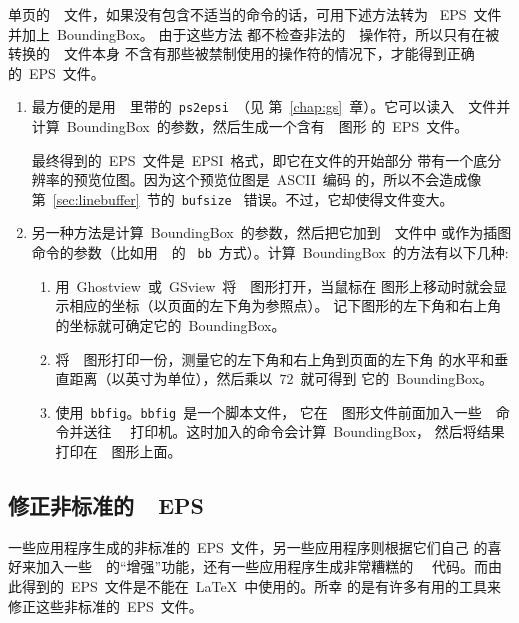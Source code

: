 单页的~\PS{}~文件，如果没有包含不适当的命令的话，可用下述方法转为
~EPS~文件并加上~BoundingBox。{ 由于这些方法
	都不检查非法的~\PS{}~操作符，所以只有在被转换的~\PS{}~文件本身
	不含有那些被禁制使用的操作符的情况下，才能得到正确的~EPS~文件。}
\begin{enumerate}
	\item 最方便的是用~\GS{}~里带的~\texttt{ps2epsi}~（见
	第~\ref{chap:gs}~章）。它可以读入~\PS{}~文件并
	计算~BoundingBox~的参数，然后生成一个含有~\PS{}~图形
	的~EPS~文件。
	
	最终得到的~EPS~文件是~EPSI~格式，即它在文件的开始部分
	带有一个底分辨率的预览位图。因为这个预览位图是~ASCII~编码
	的，所以不会造成像第~\ref{sec:linebuffer}~节的~\texttt{bufsize}~
	错误。不过，它却使得文件变大。
	\item 另一种方法是计算~BoundingBox~的参数，然后把它加到~\PS{}~文件中
	或作为插图命令的参数（比如用~~的
	~\texttt{bb}~方式）。计算~BoundingBox~的方法有以下几种:
	\begin{enumerate}
		\item 用~Ghostview~或~GSview~将~\PS~图形打开，当鼠标在
		图形上移动时就会显示相应的坐标（以页面的左下角为参照点）。
		记下图形的左下角和右上角的坐标就可确定它的~BoundingBox。
		\item 将~\PS~图形打印一份，测量它的左下角和右上角到页面的左下角                       的水平和垂直距离（以英寸为单位），然后乘以~$72$~就可得到
		它的~BoundingBox。
		\item 使用~\texttt{bbfig}。\texttt{bbfig}~是一个脚本文件，
		它在~\PS{}~图形文件前面加入一些~\PS{}~命令并送往
		~\PS{}~打印机。这时加入的命令会计算~BoundingBox，
		然后将结果打印在~\PS{}~图形上面。
	\end{enumerate}
\end{enumerate}

\clearpage

\subsection[修正非标准的~EPS]{修正非标准的~~EPS}\label{ssec:fixeps}

一些应用程序生成的非标准的~EPS~文件，另一些应用程序则根据它们自己
的喜好来加入一些~\PS~的``增强''功能，还有一些应用程序生成非常糟糕的
~\PS~代码。而由此得到的~EPS~文件是不能在~\LaTeX{}~中使用的。所幸
的是有许多有用的工具来修正这些非标准的~EPS~文件。

